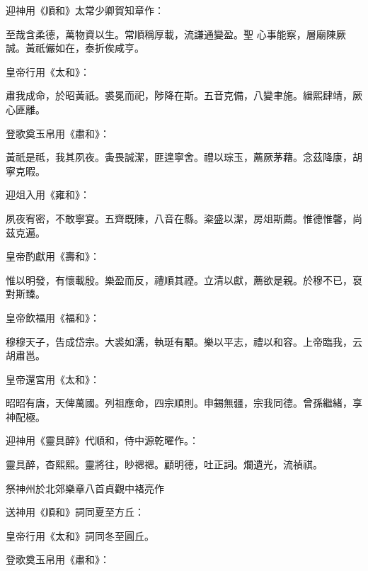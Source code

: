 \begin{pinyinscope}
 迎神用《順和》太常少卿賀知章作：



 至哉含柔德，萬物資以生。常順稱厚載，流謙通變盈。聖
 心事能察，層廟陳厥誠。黃祇儼如在，泰折俟咸亨。



 皇帝行用《太和》：



 肅我成命，於昭黃祇。裘冕而祀，陟降在斯。五音克備，八變聿施。緝熙肆靖，厥心匪離。



 登歌奠玉帛用《肅和》：



 黃祇是祗，我其夙夜。夤畏誠潔，匪遑寧舍。禮以琮玉，薦厥茅藉。念茲降康，胡寧克暇。



 迎俎入用《雍和》：



 夙夜宥密，不敢寧宴。五齊既陳，八音在縣。粢盛以潔，房俎斯薦。惟德惟馨，尚茲克遍。



 皇帝酌獻用《壽和》：



 惟以明發，有懷載殷。樂盈而反，禮順其禋。立清以獻，薦欲是親。於穆不已，裒對斯臻。



 皇帝飲福用《福和》：



 穆穆天子，告成岱宗。大裘如濡，執珽有顒。樂以平志，禮以和容。上帝臨我，云胡肅邕。



 皇帝還宮用《太和》：



 昭昭有唐，天俾萬國。列祖應命，四宗順則。申錫無疆，宗我同德。曾孫繼緒，享神配極。



 迎神用《靈具醉》代順和，侍中源乾曜作。：



 靈具醉，杳熙熙。靈將往，眇禗禗。顧明德，吐正詞。爛遺光，流禎祺。



 祭神州於北郊樂章八首貞觀中褚亮作



 送神用《順和》詞同夏至方丘：



 皇帝行用《太和》詞同冬至圓丘。



 登歌奠玉帛用《肅和》：




\end{pinyinscope}
